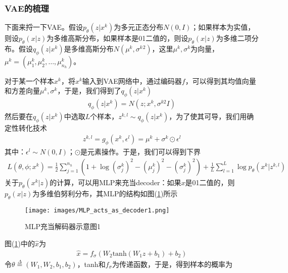         \subsubsection{VAE的梳理}
            \par
            下面来捋一下VAE。假设$p_\theta(z|x^k)$为多元正态分布$N(0,I)$；如果样本为实值，则设$p_\theta(x|z)$为多维高斯分布，如果样本是01二值的，则设$p_\theta(x|z)$为多维二项分布。假设$q_\phi(z|x^k)$是多维高斯分布$N(\mu^k,\sigma^k{}^2)$，这里$\mu^k,\sigma^k$为向量，$\mu^k = (\mu_1^k,\mu_2^k,\dots,\mu_{n_h}^k)$。
            \par
            对于某一个样本$x^k$，将$x^k$输入到VAE网络中，通过编码器$f$，可以得到其均值向量和方差向量$\mu^k,\sigma^k$，于是，我们得到了$q_\phi(z|x^k)$
            \begin{align*}
            q_\phi(z|x^k) = N(z;x^k,\sigma^{k2}I)
            \end{align*}
            然后要在$q_\phi(z|x^k)$中选取$L$个样本，$z^{k,l} \sim q_\phi(z|x^k)$，为了使其可导，我们用确定性转化技术
            \begin{align*}
            z^{k,l} = g_\phi(x^k,\epsilon^l) = \mu^k+\sigma^k\odot \epsilon^l
            \end{align*}
            其中：$\epsilon^l \sim N(0,I)$；$\odot$是元素操作。于是，我们可以得到下界
            \begin{align*}
            L(\theta,\phi;x^k) = \frac{1}{2}\sum_{j=1}^{n_h} \left( 1+\log(\sigma_j^k)^2 - (\mu_j^k)^2 - (\sigma_j^k)^2 \right) + \frac{1}{L}\sum_{l=1}^L \log p_\theta(x^k|z^{k,l})
            \end{align*}
            关于$p_\theta(x^k|z)$的计算，可以用MLP来充当decoder：如果$x$是01二值的，则$p_\theta(x|z)$为多维伯努利分布，其MLP的结构如图(\ref{fig:MLP充当解码器示意图1})所示
            \begin{figure}[H]
            \centering
            \texttt{[image: images/MLP\_acts\_as\_decoder1.png]}
            \caption{MLP充当解码器示意图1}
            \label{fig:MLP充当解码器示意图1}
            \end{figure}
            图(\ref{fig:MLP充当解码器示意图1})中的$\hat{x}$为
            \begin{align*}
            \hat{x} = f_\sigma (W_2\mathrm{tanh}(W_1z+b_1)+b_2)
            \end{align*}
            令$\theta \overset{\Delta}{=} (W_1,W_2,b_1,b_2)$，tanh和$f_\sigma$为传递函数，于是，得到样本的概率为
